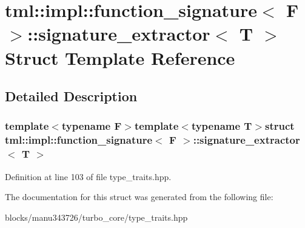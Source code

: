 \hypertarget{structtml_1_1impl_1_1function__signature_1_1signature__extractor}{\section{tml\+:\+:impl\+:\+:function\+\_\+signature$<$ F $>$\+:\+:signature\+\_\+extractor$<$ T $>$ Struct Template Reference}
\label{structtml_1_1impl_1_1function__signature_1_1signature__extractor}
}


\subsection{Detailed Description}
\subsubsection*{template$<$typename F$>$template$<$typename T$>$struct tml\+::impl\+::function\+\_\+signature$<$ F $>$\+::signature\+\_\+extractor$<$ T $>$}



Definition at line 103 of file type\+\_\+traits.\+hpp.



The documentation for this struct was generated from the following file\+:\begin{DoxyCompactItemize}
\item 
blocks/manu343726/turbo\+\_\+core/type\+\_\+traits.\+hpp\end{DoxyCompactItemize}
